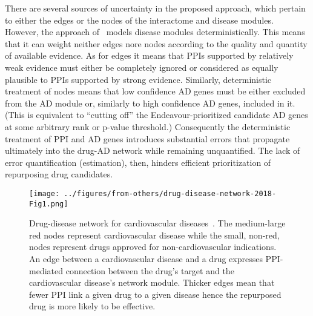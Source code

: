 \documentclass[letterpaper]{article}
\begin{document}
There are several sources of uncertainty in the proposed approach, which
pertain to either the edges or the nodes of the interactome and disease
modules.  However, the approach of~\cite{Cheng2018} models disease modules
deterministically.  This means that it can weight neither edges nore nodes
according to the quality and quantity of available evidence.  As for edges it
means that PPIs supported by relatively weak evidence must either be
completely ignored or considered as equally plausible to PPIs supported by
strong evidence.  Similarly, deterministic treatment of nodes means that low
confidence AD genes must be either excluded from the AD module
or, similarly to high confidence AD genes, included in it. (This is equivalent
to ``cutting off'' the Endeavour-prioritized candidate AD genes at some
arbitrary rank or p-value threshold.) Consequently the
deterministic treatment of PPI and AD genes introduces substantial errors
that propagate ultimately into the drug-AD network while remaining
unquantified.  The lack of error quantification (estimation), then, hinders
efficient prioritization of repurposing drug candidates.

\begin{figure}
\begin{center}
\texttt{[image: ../figures/from-others/drug-disease-network-2018-Fig1.png]}
\end{center}
\caption{Drug-disease network for cardiovascular diseases~\citep{Cheng2018}.
The medium-large red nodes represent cardiovascular disease while the small,
non-red, nodes represent drugs approved for non-cardiovascular indications.
An edge between a cardiovascular disease and a drug expresses PPI-mediated connection
between the drug's target and the cardiovascular disease's network module.
Thicker edges mean that fewer PPI link a given drug to a given disease hence
the repurposed drug is more likely to be effective.}
\label{fig:drug-disease-net}
\end{figure}


\end{document}
